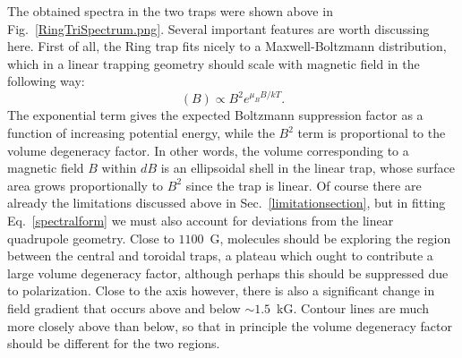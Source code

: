The obtained spectra in the two traps were shown above in Fig.~\ref{RingTriSpectrum.png}.
Several important features are worth discussing here.
First of all, the Ring trap fits nicely to a Maxwell-Boltzmann distribution, which in a linear trapping geometry should scale with magnetic field in the following way:
\begin{equation}
\label{spectralform}(B)\propto B^2e^{\mu_B B/kT}.
\end{equation}
The exponential term gives the expected Boltzmann suppression factor as a function of increasing potential energy, while the $B^2$ term is proportional to the volume degeneracy factor.
In other words, the volume corresponding to a magnetic field $B$ within $dB$ is an ellipsoidal shell in the linear trap, whose surface area grows proportionally to $B^2$ since the trap is linear.
Of course there are already the limitations discussed above in Sec.~\ref{limitationsection}, but in fitting Eq.~\ref{spectralform} we must also account for deviations from the linear quadrupole geometry.
Close to $1100$~G, molecules should be exploring the region between the central and toroidal traps, a plateau which ought to contribute a large volume degeneracy factor, although perhaps this should be suppressed due to polarization.
Close to the axis however, there is also a significant change in field gradient that occurs above and below $\sim1.5$~kG. Contour lines are much more closely above  than below, so that in principle the volume degeneracy factor should be different for the two regions.

